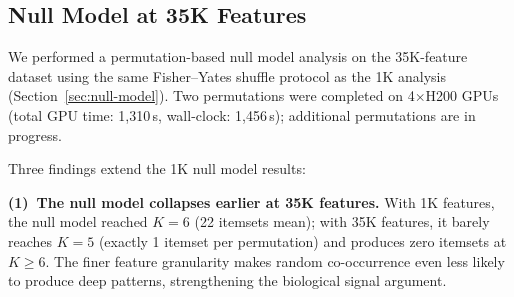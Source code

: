 \subsection{Null Model at 35K Features}
\label{sec:null-model-35k}

We performed a permutation-based null model analysis on the 35K-feature
dataset using the same Fisher--Yates shuffle protocol as the 1K analysis
(Section~\ref{sec:null-model}). Two permutations were completed on
4$\times$H200 GPUs (total GPU time: 1,310\,s, wall-clock: 1,456\,s);
additional permutations are in progress.

\begin{table}[t]
\caption{Biological vs.\ null model $K$-distributions at 0.001\% support
with 35,012 features (2 permutations). The null model collapses at $K{=}5$
(1 itemset per permutation); all $K{\geq}3$ patterns are massively enriched
($Z{=}723$ at $K{=}3$, $Z{>}20{,}000$ at $K{=}4$, $Z{=}\infty$ for
$K{\geq}5$).}
\label{tab:null-model-35k}
\centering
{}
\end{table}

Three findings extend the 1K null model results:

\textbf{(1)~The null model collapses earlier at 35K features.}
With 1K features, the null model reached $K{=}6$ (22 itemsets mean); with
35K features, it barely reaches $K{=}5$ (exactly 1 itemset per permutation)
and produces zero itemsets at $K{\geq}6$. The finer feature granularity makes
random co-occurrence even less likely to produce deep patterns, strengthening
the biological signal argument.

